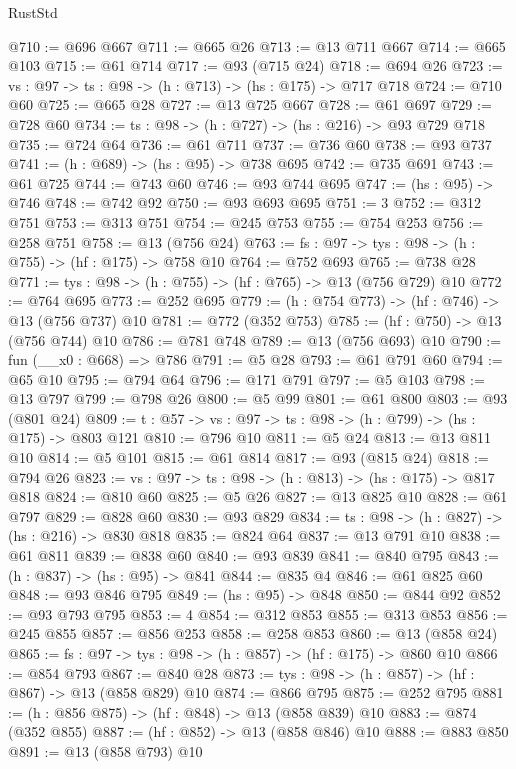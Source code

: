 \begin{lexlean}{RustStd}
\begin{coremodule}
@710 := @696 @667
@711 := @665 @26
@713 := @13 @711 @667
@714 := @665 @103
@715 := @61 @714
@717 := @93 (@715 @24)
@718 := @694 @26
@723 := {vs : @97} -> {ts : @98} -> (h : @713) -> (hs : @175) -> @717 @718
@724 := @710 @60
@725 := @665 @28
@727 := @13 @725 @667
@728 := @61 @697
@729 := @728 @60
@734 := {ts : @98} -> (h : @727) -> (hs : @216) -> @93 @729 @718
@735 := @724 @64
@736 := @61 @711
@737 := @736 @60
@738 := @93 @737
@741 := (h : @689) -> (hs : @95) -> @738 @695
@742 := @735 @691
@743 := @61 @725
@744 := @743 @60
@746 := @93 @744 @695
@747 := (hs : @95) -> @746
@748 := @742 @92
@750 := @93 @693 @695
@751 := 3
@752 := @312 @751
@753 := @313 @751
@754 := @245 @753
@755 := @754 @253
@756 := @258 @751
@758 := @13 (@756 @24)
@763 := {fs : @97} -> {tys : @98} -> (h : @755) -> (hf : @175) -> @758 @10
@764 := @752 @693
@765 := @738 @28
@771 := {tys : @98} -> (h : @755) -> (hf : @765) -> @13 (@756 @729) @10
@772 := @764 @695
@773 := @252 @695
@779 := (h : @754 @773) -> (hf : @746) -> @13 (@756 @737) @10
@781 := @772 (@352 @753)
@785 := (hf : @750) -> @13 (@756 @744) @10
@786 := @781 @748
@789 := @13 (@756 @693) @10
@790 := fun (__x0 : @668) => @786
@791 := @5 @28
@793 := @61 @791 @60
@794 := @65 @10
@795 := @794 @64
@796 := @171 @791
@797 := @5 @103
@798 := @13 @797
@799 := @798 @26
@800 := @5 @99
@801 := @61 @800
@803 := @93 (@801 @24)
@809 := {t : @57} -> {vs : @97} -> {ts : @98} -> (h : @799) -> (hs : @175) -> @803 @121
@810 := @796 @10
@811 := @5 @24
@813 := @13 @811 @10
@814 := @5 @101
@815 := @61 @814
@817 := @93 (@815 @24)
@818 := @794 @26
@823 := {vs : @97} -> {ts : @98} -> (h : @813) -> (hs : @175) -> @817 @818
@824 := @810 @60
@825 := @5 @26
@827 := @13 @825 @10
@828 := @61 @797
@829 := @828 @60
@830 := @93 @829
@834 := {ts : @98} -> (h : @827) -> (hs : @216) -> @830 @818
@835 := @824 @64
@837 := @13 @791 @10
@838 := @61 @811
@839 := @838 @60
@840 := @93 @839
@841 := @840 @795
@843 := (h : @837) -> (hs : @95) -> @841
@844 := @835 @4
@846 := @61 @825 @60
@848 := @93 @846 @795
@849 := (hs : @95) -> @848
@850 := @844 @92
@852 := @93 @793 @795
@853 := 4
@854 := @312 @853
@855 := @313 @853
@856 := @245 @855
@857 := @856 @253
@858 := @258 @853
@860 := @13 (@858 @24)
@865 := {fs : @97} -> {tys : @98} -> (h : @857) -> (hf : @175) -> @860 @10
@866 := @854 @793
@867 := @840 @28
@873 := {tys : @98} -> (h : @857) -> (hf : @867) -> @13 (@858 @829) @10
@874 := @866 @795
@875 := @252 @795
@881 := (h : @856 @875) -> (hf : @848) -> @13 (@858 @839) @10
@883 := @874 (@352 @855)
@887 := (hf : @852) -> @13 (@858 @846) @10
@888 := @883 @850
@891 := @13 (@858 @793) @10

\end{coremodule}
\end{lexlean}
